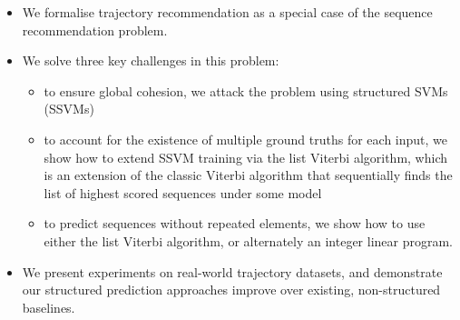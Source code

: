 \begin{itemize}[noitemsep,leftmargin=12pt]%
    \item We formalise trajectory recommendation as a special case of the sequence recommendation problem.

	\item We solve three key challenges in this problem:
	\begin{itemize}
		\item to ensure global cohesion, we attack the problem using structured SVMs (SSVMs)
		\item to account for the existence of multiple ground truths for each input, we show how
		to extend SSVM training via the list Viterbi algorithm, 
        which is an extension of the classic Viterbi algorithm that sequentially finds the list of highest scored sequences under some model
		\item to predict sequences without repeated elements, we show how to use either the list Viterbi algorithm, or alternately an integer linear program.
	\end{itemize}

	\item We present experiments on real-world trajectory datasets, and demonstrate our structured prediction approaches improve over existing, non-structured baselines. %





\end{itemize}
